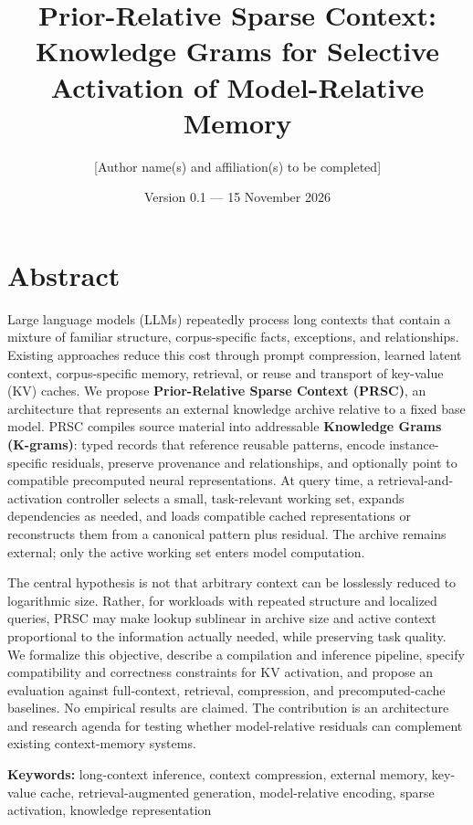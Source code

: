 \documentclass[
  10pt,
]{article}
\title{Prior-Relative Sparse Context: Knowledge Grams for Selective
Activation of Model-Relative Memory}
\author{{[}Author name(s) and affiliation(s) to be completed{]}}
\date{Version 0.1 --- 15 November 2026}
\begin{document}
\maketitle

\section{Abstract}\label{abstract}

Large language models (LLMs) repeatedly process long contexts that
contain a mixture of familiar structure, corpus-specific facts,
exceptions, and relationships. Existing approaches reduce this cost
through prompt compression, learned latent context, corpus-specific
memory, retrieval, or reuse and transport of key-value (KV) caches. We
propose \textbf{Prior-Relative Sparse Context (PRSC)}, an architecture
that represents an external knowledge archive relative to a fixed base
model. PRSC compiles source material into addressable \textbf{Knowledge
Grams (K-grams)}: typed records that reference reusable patterns, encode
instance-specific residuals, preserve provenance and relationships, and
optionally point to compatible precomputed neural representations. At
query time, a retrieval-and-activation controller selects a small,
task-relevant working set, expands dependencies as needed, and loads
compatible cached representations or reconstructs them from a canonical
pattern plus residual. The archive remains external; only the active
working set enters model computation.

The central hypothesis is not that arbitrary context can be losslessly
reduced to logarithmic size. Rather, for workloads with repeated
structure and localized queries, PRSC may make lookup sublinear in
archive size and active context proportional to the information actually
needed, while preserving task quality. We formalize this objective,
describe a compilation and inference pipeline, specify compatibility and
correctness constraints for KV activation, and propose an evaluation
against full-context, retrieval, compression, and precomputed-cache
baselines. No empirical results are claimed. The contribution is an
architecture and research agenda for testing whether model-relative
residuals can complement existing context-memory systems.

\textbf{Keywords:} long-context inference, context compression, external
memory, key-value cache, retrieval-augmented generation, model-relative
encoding, sparse activation, knowledge representation
\end{document}

